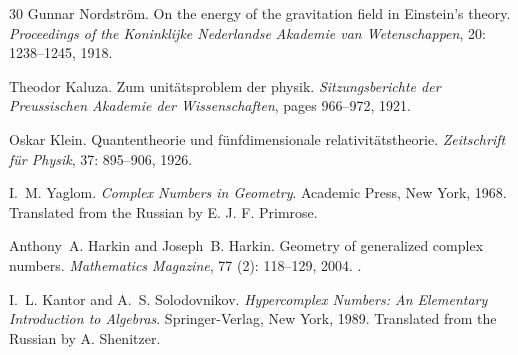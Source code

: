 \documentclass[11pt,a4paper]{article}
\theoremstyle{plain}
\theoremstyle{definition}
\theoremstyle{remark}
\begin{document}
\begin{thebibliography}{30}
Gunnar Nordstr{\"o}m.
\newblock On the energy of the gravitation field in {E}instein's theory.
\newblock \emph{Proceedings of the Koninklijke Nederlandse Akademie van
  Wetenschappen}, 20: 1238--1245, 1918.

Theodor Kaluza.
\newblock Zum unit{\"a}tsproblem der physik.
\newblock \emph{Sitzungsberichte der Preussischen Akademie der Wissenschaften},
  pages 966--972, 1921.

Oskar Klein.
\newblock Quantentheorie und f{\"u}nfdimensionale relativit{\"a}tstheorie.
\newblock \emph{Zeitschrift f{\"u}r Physik}, 37: 895--906, 1926.

I.~M. Yaglom.
\newblock \emph{Complex Numbers in Geometry}.
\newblock Academic Press, New York, 1968.
\newblock Translated from the Russian by E. J. F. Primrose.

Anthony~A. Harkin and Joseph~B. Harkin.
\newblock Geometry of generalized complex numbers.
\newblock \emph{Mathematics Magazine}, 77 (2): 118--129,
  2004.
\newblock {}.

I.~L. Kantor and A.~S. Solodovnikov.
\newblock \emph{Hypercomplex Numbers: An Elementary Introduction to Algebras}.
\newblock Springer-Verlag, New York, 1989.
\newblock Translated from the Russian by A. Shenitzer.

\end{thebibliography}

\appendix
\renewcommand{\thesection}{\Alph{section}}

\end{document}
